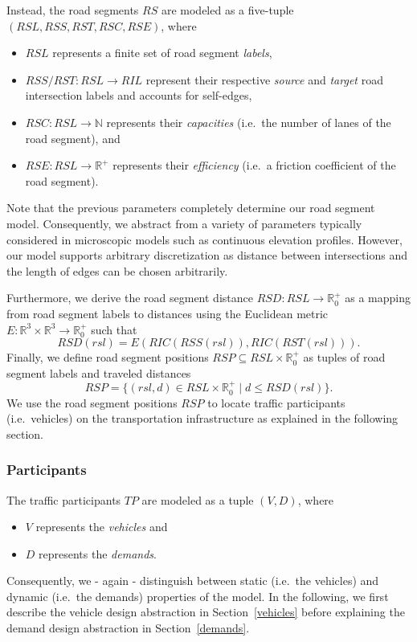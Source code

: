 Instead, the road segments $RS$ are modeled as a five-tuple $(RSL, RSS, RST, RSC, RSE)$, where
\begin{itemize}
	\item $RSL$ represents a finite set of road segment \textit{labels},
	\item $RSS/RST: RSL \rightarrow RIL$ represent their respective \textit{source} and \textit{target} road intersection labels and accounts for self-edges,
	\item $RSC: RSL \rightarrow \mathbb{N}$ represents their \textit{capacities} (i.e.\ the number of lanes of the road segment), and
	\item $RSE: RSL \rightarrow \mathbb{R}^+$ represents their \textit{efficiency} (i.e.\ a friction coefficient of the road segment).
\end{itemize}
Note that the previous parameters completely determine our road segment model. Consequently, we abstract from a variety of parameters typically considered in microscopic models such as continuous elevation profiles. However, our model supports arbitrary discretization as distance between intersections and the length of edges can be chosen arbitrarily.


Furthermore, we derive the road segment distance $RSD: RSL \rightarrow \mathbb{R}_0^+$ as a mapping from road segment labels to distances using the Euclidean metric $E: \mathbb{R}^3 \times \mathbb{R}^3 \rightarrow \mathbb{R}_0^+$ such that
\[
	RSD(rsl) = E(RIC(RSS(rsl)), RIC(RST(rsl))) \textrm{.}
\]
Finally, we define road segment positions $RSP \subseteq RSL \times \mathbb{R}_0^+$ as tuples of road segment labels and traveled distances
\[
	RSP = \{(rsl, d) \in RSL \times \mathbb{R}_0^+ \mid d \leq RSD(rsl)\} \textrm{.}
\]
We use the road segment positions $RSP$ to locate traffic participants (i.e.\ vehicles) on the transportation infrastructure as explained in the following section. 

\subsubsection{Participants}
\label{participants}

The traffic participants $TP$ are modeled as a tuple $(V, D)$, where
\begin{itemize}
	\item $V$ represents the \textit{vehicles} and
	\item $D$ represents the \textit{demands}.
\end{itemize}
Consequently, we - again - distinguish between static (i.e.\ the vehicles) and dynamic (i.e.\ the demands) properties of the model. In the following, we first describe the vehicle design abstraction in Section~\ref{vehicles} before explaining the demand design abstraction in Section~\ref{demands}.

